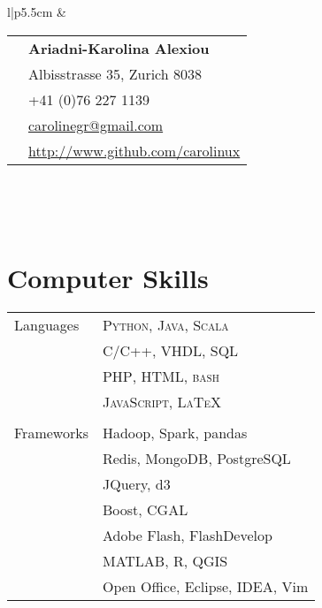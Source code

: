 \documentclass[10pt]{article} %
\begin{document}
\begin{minipage}[t]{0.44\textwidth} %
\vspace{0pt} %


\colorbox{shade}{\textcolor{text1}{
        \begin{tabular}{l|p{5.5cm}}
             &
        \begin{tabular}{l|p{5cm}}
    \raisebox{0pt}{\Smiley} & \textbf{Ariadni-Karolina Alexiou} \\ %
    \raisebox{-1pt}{\textifsymbol{18}} & Albisstrasse 35, Zurich 8038 \\ %
    \raisebox{-1pt}{\Mobilefone} & +41 (0)76 227 1139\\ %
    \raisebox{-1pt}{\Letter} & \href{mailto:carolinegr@gmail.com}{carolinegr@gmail.com} \\ %
    \Keyboard & \href{http://www.github.com/carolinux}{http://www.github.com/carolinux} \\ %
        \end{tabular}  \\ %
\end{tabular}
}
}\\[10pt]






\section{Computer Skills} 

\begin{tabular}{ll}
Languages
& \textsc{Python}, \textsc{Java}, \textsc{Scala} \\
& \textsc{C/C++}, \textsc{VHDL}, \textsc{SQL} \\
& \textsc{PHP}, \textsc{HTML}, \textsc{bash} \\
& \textsc{JavaScript}, \textsc{\LaTeX} \\
&\\
Frameworks
& Hadoop, Spark, pandas \\
& Redis, MongoDB, PostgreSQL \\
& JQuery, d3 \\
& Boost, CGAL \\
& Adobe Flash, FlashDevelop \\
& MATLAB, R, QGIS \\
& Open Office, Eclipse, IDEA, Vim\\



\end{tabular}
\end{minipage}
\end{document}

